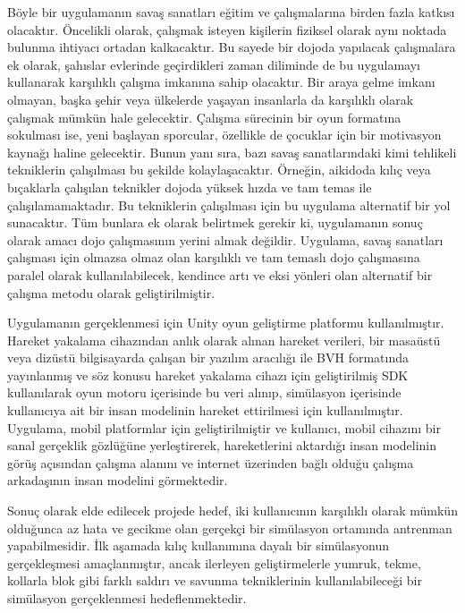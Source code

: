 \documentclass[a4paper, 12pt, titlepage]{article}
\begin{document}
Böyle bir uygulamanın savaş sanatları eğitim ve çalışmalarına birden fazla katkısı olacaktır.
Öncelikli olarak, çalışmak isteyen kişilerin fiziksel olarak aynı noktada bulunma ihtiyacı ortadan
kalkacaktır. Bu sayede bir dojoda yapılacak çalışmalara ek olarak, şahıslar evlerinde geçirdikleri
zaman diliminde de bu uygulamayı kullanarak karşılıklı çalışma imkanına sahip olacaktır. Bir araya
gelme imkanı olmayan, başka şehir veya ülkelerde yaşayan insanlarla da karşılıklı olarak çalışmak
mümkün hale gelecektir. Çalışma sürecinin bir oyun formatına sokulması ise, yeni başlayan
sporcular, özellikle de çocuklar için bir motivasyon kaynağı haline gelecektir. Bunun yanı sıra,
bazı savaş sanatlarındaki kimi tehlikeli tekniklerin çalışılması bu şekilde kolaylaşacaktır.
Örneğin, aikidoda kılıç veya bıçaklarla çalışılan teknikler dojoda yüksek hızda ve tam temas ile
çalışılamamaktadır. Bu tekniklerin çalışılması için bu uygulama alternatif bir yol sunacaktır. Tüm
bunlara ek olarak belirtmek gerekir ki, uygulamanın sonuç olarak amacı dojo çalışmasının yerini
almak değildir. Uygulama, savaş sanatları çalışması için olmazsa olmaz olan karşılıklı ve tam
temaslı dojo çalışmasına paralel olarak kullanılabilecek, kendince artı ve eksi yönleri olan
alternatif bir çalışma metodu olarak geliştirilmiştir.

Uygulamanın gerçeklenmesi için Unity oyun geliştirme platformu kullanılmıştır.
Hareket yakalama cihazından anlık olarak alınan hareket verileri, bir masaüstü veya dizüstü bilgisayarda
çalışan bir yazılım aracılığı ile BVH formatında yayınlanmış ve söz konusu hareket yakalama cihazı için
geliştirilmiş SDK kullanılarak oyun motoru içerisinde bu veri alınıp, simülasyon içerisinde
kullanıcıya ait bir insan modelinin hareket ettirilmesi için kullanılmıştır. Uygulama, mobil
platformlar için geliştirilmiştir ve kullanıcı, mobil cihazını bir sanal gerçeklik gözlüğüne
yerleştirerek, hareketlerini aktardığı insan modelinin görüş açısından çalışma alanını ve internet
üzerinden bağlı olduğu çalışma arkadaşının insan modelini görmektedir.

Sonuç olarak elde edilecek projede hedef, iki kullanıcının karşılıklı olarak mümkün olduğunca az
hata ve gecikme olan gerçekçi bir simülasyon ortamında antrenman yapabilmesidir. İlk aşamada kılıç
kullanımına dayalı bir simülasyonun gerçekleşmesi amaçlanmıştır, ancak ilerleyen geliştirmelerle
yumruk, tekme, kollarla blok gibi farklı saldırı ve savunma tekniklerinin kullanılabileceği bir
simülasyon gerçeklenmesi hedeflenmektedir.

\newpage
\end{document}
